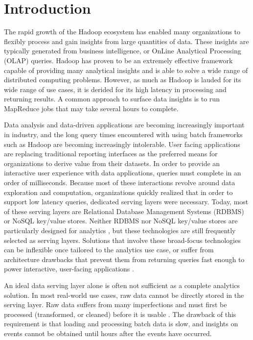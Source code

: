 \documentclass{vldb}
\begin{document}
\section{Introduction}
The rapid growth of the Hadoop\cite{shvachko2010hadoop} ecosystem has enabled
many organizations to flexibly process and gain insights from large quantities
of data. These insights are typically generated from business intelligence, or
OnLine Analytical Processing (OLAP) queries. Hadoop has proven to be an
extremely effective framework capable of providing many analytical insights and
is able to solve a wide range of distributed computing problems. However, as
much as Hadoop is lauded for its wide range of use cases, it is derided for its
high latency in processing and returning results. A common approach to surface
data insights is to run MapReduce jobs that may take several hours to complete.

Data analysis and data-driven applications are becoming increasingly important
in industry, and the long query times encountered with using batch frameworks
such as Hadoop are becoming increasingly intolerable. User facing applications
are replacing traditional reporting interfaces as the preferred means for
organizations to derive value from their datasets. In order to provide an
interactive user experience with data applications, queries must complete in an
order of milliseconds. Because most of these interactions revolve around data
exploration and computation, organizations quickly realized that in order to 
support low latency queries, dedicated serving layers were necessary. Today,
most of these serving layers are Relational Database Management Systems (RDBMS)
or NoSQL key/value stores. Neither RDBMS nor NoSQL key/value stores are
particularly designed for analytics \cite{stonebraker2009requirements}, but
these technologies are still frequently selected as serving layers. Solutions
that involve these broad-focus technologies can be inflexible once tailored to
the analytics use case, or suffer from architecture drawbacks that prevent them
from returning queries fast enough to power interactive, user-facing
applications \cite{tschetter2011druid}.

An ideal data serving layer alone is often not sufficient as a complete analytics
solution. In most real-world use cases, raw data cannot be directly stored in
the serving layer. Raw data suffers from many imperfections and must first be
processed (transformed, or cleaned) before it is usable
\cite{stonebraker2010mapreduce}. The drawback of this requirement is that
loading and processing batch data is slow, and insights on events cannot be
obtained until hours after the events have occurred.
\end{document}
